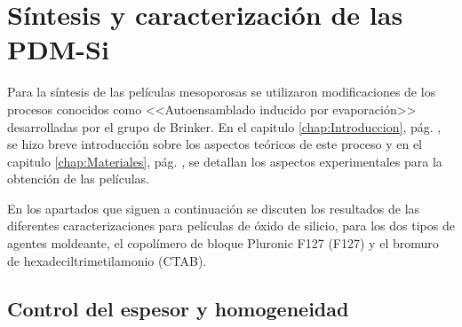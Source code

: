 
\section{Síntesis y caracterización de las PDM-Si}
		
	Para la síntesis de las películas mesoporosas se utilizaron modificaciones de los procesos conocidos como <<Autoensamblado inducido por evaporación>> desarrolladas por el grupo de Brinker.\cite{Brinker1999} En el capitulo \ref{chap:Introduccion}, pág. \pageref{sec:mesoporosos}, se hizo breve introducción sobre los aspectos teóricos de este proceso y en el capitulo \ref{chap:Materiales}, pág. \pageref{sec:sintesis_mesoporosos}, se detallan los aspectos experimentales para la obtención de las películas.

	En los apartados que siguen a continuación se discuten los resultados de las diferentes caracterizaciones para películas de óxido de silicio, para los dos tipos de agentes moldeante, el copolímero de bloque Pluronic F127 (F127) y el bromuro de hexadeciltrimetilamonio (CTAB). 

	\subsection{Control del espesor y homogeneidad}
		
